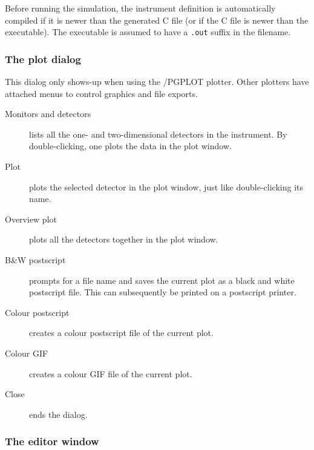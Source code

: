 Before running the simulation, the instrument definition is
automatically compiled if it is newer than the generated C file (or if the C file
is newer than the executable). The executable is
assumed to have a \verb+.out+ suffix in the filename.


\subsubsection{The plot dialog}
This dialog only shows-up when using the \MCS/PGPLOT plotter. Other plotters have attached menus to control graphics and file exports.
\begin{description}
\item[Monitors and detectors] lists all the one- and
  two-dimensional detectors in the instrument. By double-clicking, one plots
  the data in the plot window.
\item[Plot] plots the selected detector in the plot window, just
  like double-clicking its name.
\item[Overview plot] plots all the detectors together in the plot
  window.
\item[B\&W postscript] prompts for a file name and saves the
  current plot as a black and white postscript file. This can
  subsequently be printed on a postscript printer.
\item[Colour postscript] creates a colour postscript file of the
  current plot.
\item[Colour GIF] creates a colour GIF file of the
  current plot.  
\item[Close] ends the dialog.
\end{description}


\subsubsection{The editor window}

